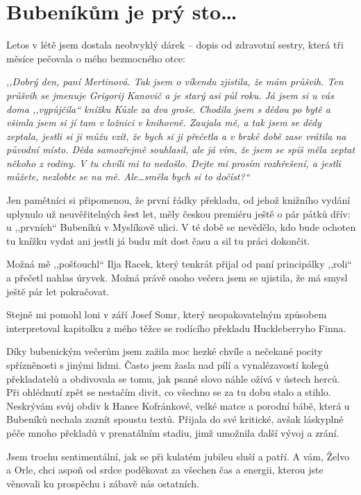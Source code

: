 \section{Bubeníkům je prý sto\ldots}

\noindent
Letos v létě jsem dostala neobvyklý dárek -- dopis od zdravotní sestry, která tři měsíce pečovala o mého bezmocného otce:

\medskip

\noindent
\textit{,,Dobrý den, paní Mertinová. Tak jsem o víkendu zjistila, že mám průšvih. Ten průšvih se jmenuje Grigorij Kanovič a je starý asi půl roku. Já jsem si u vás doma ,,vypůjčila`` knížku Kůzle za dva groše. Chodila jsem s dědou po bytě a všimla jsem si jí tam v ložnici v knihovně. Zaujala mě, a tak jsem se dědy zeptala, jestli si ji můžu vzít, že bych si ji přečetla a v brzké době zase vrátila na původní místo. Děda samozřejmě souhlasil, ale já vím, že jsem se spíš měla zeptat někoho z rodiny. V tu chvíli mi to nedošlo. Dejte mi prosím rozhřešení, a jestli můžete, nezlobte se na mě. Ale\ldots směla bych si to dočíst?``}

\medskip

\noindent
Jen pamětníci si připomenou, že první řádky překladu, od jehož knižního vydání uplynulo už neuvěřitelných šest let, měly českou premiéru ještě o pár pátků dřív: u ,,prvních`` Bubeníků v Myslíkově ulici. V té době se nevědělo, kdo bude ochoten tu knížku vydat ani jestli já budu mít dost času a sil tu práci dokončit. 

Možná mě ,,pošťouchl`` Ilja Racek, který tenkrát přijal od paní principálky ,,roli`` a přečetl nahlas úryvek. Možná právě onoho večera jsem se ujistila, že má smysl ještě pár let pokračovat.

Stejně mi pomohl loni v září Josef Somr, který neopakovatelným způsobem interpretoval kapitolku z mého těžce se rodícího překladu Huckleberryho Finna.

Díky bubenickým večerům jsem zažila moc hezké chvíle a nečekané pocity spřízněnosti s jinými lidmi. Často jsem žasla nad pílí a vynalézavostí kolegů překladatelů a obdivovala se tomu, jak psané slovo náhle ožívá v ústech herců. Při ohlédnutí zpět se nestačím divit, co všechno se za tu dobu stalo a stihlo. Neskrývám svůj obdiv k Hance Kofránkové, velké matce a porodní bábě, která u Bubeníků nechala zaznít spoustu textů. Přijala do své kritické, avšak láskyplné péče mnoho překladů v prenatálním stadiu, jimž umožnila další vývoj a zrání. 

Jsem trochu sentimentální, jak se při kulatém jubileu sluší a patří. A vám, Želvo a Orle, chci aspoň od srdce poděkovat za všechen čas a energii, kterou jste věnovali ku prospěchu i zábavě nás ostatních.


